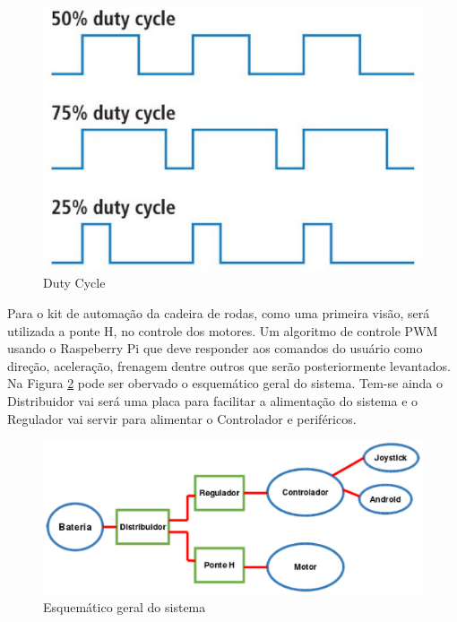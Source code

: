 \begin{figure}[!htb]
\centering
  \includegraphics[keepaspectratio=true,scale=0.5]{figuras/controle/ondas_quadradas}
\caption{Duty Cycle}
\label{fig:ondas_quadradas}
\end{figure}

Para o kit de automação da cadeira de rodas, como uma primeira visão, será utilizada a ponte H, no controle dos motores. Um algoritmo de controle PWM usando o Raspeberry Pi que deve responder aos comandos do usuário como direção, aceleração, frenagem dentre outros que serão posteriormente levantados. Na Figura \ref{fig:esquema_controle} pode ser obervado o esquemático geral do sistema. Tem-se ainda o Distribuidor vai será uma placa para facilitar a alimentação do sistema e o Regulador vai servir para alimentar o Controlador e periféricos.

\begin{figure}[!htb]
\centering
  \includegraphics[keepaspectratio=true,scale=0.6]{figuras/controle/esquema_controle}
\caption{Esquemático geral do sistema}
\label{fig:esquema_controle}
\end{figure}

